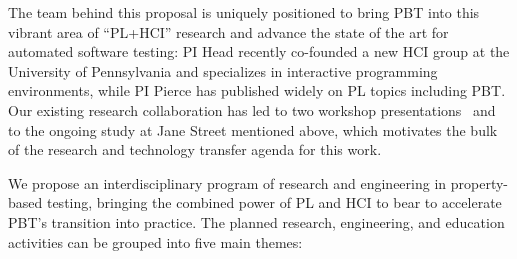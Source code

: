 The team
behind this proposal is uniquely positioned to bring PBT into this vibrant area
of ``PL+HCI'' research and advance the state of
the art for automated software testing: PI Head recently
co-founded a new HCI group at
the University of Pennsylvania and specializes in interactive
programming environments, while PI Pierce has published widely on PL
topics including PBT.  Our existing research collaboration has led to
two workshop
presentations~\cite{goldstein_problems_2022,shi_towards_2023} and to the ongoing
study at Jane Street mentioned above, which motivates the bulk of the
research and technology transfer agenda for this work.

\smallskip

We propose an interdisciplinary program of research and engineering in
{property-based testing}, bringing the combined power of PL and HCI to
bear to accelerate PBT's transition into practice.
%
The planned research,
engineering, and education activities can be grouped into five main
themes: 
